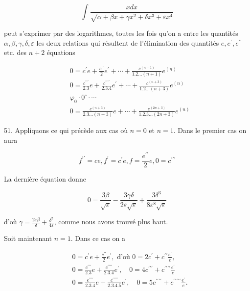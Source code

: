 \documentclass{article}
\begin{document}
\[
\int \frac{x d x}{\sqrt{\alpha+\beta x+\gamma x^{2}+\delta x^{3}+\varepsilon x^{4}}}
\]

peut s'exprimer par des logarithmes, toutes les fois qu'on a entre les quantités \(\alpha, \beta, \gamma, \delta, \varepsilon\) les deux relations qui résultent de l'élimination des quantités \(e, e^{\prime}, e^{\prime \prime}\) etc. des \(n+2\) équations

\[
\begin{aligned}
& 0=c^{\prime} e+\frac{c^{\prime \prime}}{2} e^{\prime}+\cdots+\frac{c^{(n+1)}}{1.2 \ldots(n+1)} e^{(n)} \\
& 0=\frac{c^{\prime \prime \prime}}{2.3} e+\frac{c^{\prime \prime \prime \prime}}{2.3 .4} e^{\prime}+\cdots+\frac{c^{(n+3)}}{1.2 \ldots(n+3)} e^{(n)} \\
& \varphi_{0} \cdot 0^{\circ} \cdot \cdots \\
& 0=\frac{c^{(n+3)}}{2.3 \ldots(n+3)} e+\cdots+\frac{e^{(2 n+3)}}{1.2 .3 \ldots(2 n+3)} e^{(n)}
\end{aligned}
\]

51. Appliquons ce qui précède aux cas où \(n=0\) et \(n=1\). Dans le premier cas on aura

\[
f^{\prime \prime}=c e, f^{\prime}=c^{\prime} e, f=\frac{e^{\prime \prime}}{2} e, 0=c^{\prime \prime \prime}
\]

La dernière équation donne

\[
0=\frac{3 \beta}{\sqrt{\varepsilon}}-\frac{3 \gamma \delta}{2 \varepsilon \sqrt{\varepsilon}}+\frac{3 \delta^{3}}{8 \varepsilon^{8} \sqrt{\varepsilon}}
\]

d'où \(\gamma=\frac{2 \varepsilon \beta}{\delta}+\frac{\delta^{2}}{4 \varepsilon}\), comme nous avons trouvé plus haut.

Soit maintenant \(n=1\). Dans ce cas on a

\[
\begin{aligned}
& 0=c^{\prime} e+\frac{c^{\prime \prime}}{2} e^{\prime}, \text { d'où } 0=2 c^{\prime}+c^{\prime \prime} \frac{e^{\prime}}{e}, \\
& 0=\frac{c^{\prime \prime \prime}}{2.3} e+\frac{c^{\prime \prime \prime \prime}}{2.3 .4} e^{\prime}, \quad 0=4 c^{\prime \prime \prime}+c^{\prime \prime \prime \prime} \frac{e^{\prime}}{e} \\
& 0=\frac{e^{\prime \prime \prime \prime}}{2.3 .4} e+\frac{c^{\prime \prime \prime \prime \prime}}{2.3 .4 .5} e^{\prime}, \quad 0=5 c^{\prime \prime \prime \prime}+c^{\prime \prime \prime \prime \prime} \frac{e^{\prime}}{e} .
\end{aligned}
\]
\end{document}

